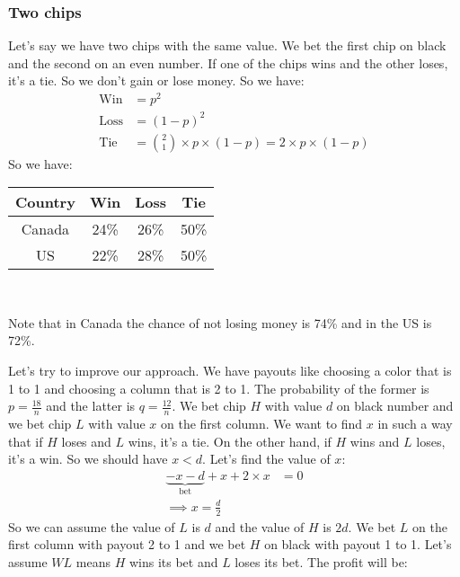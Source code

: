 \documentclass{book}
\begin{document}
	\subsubsection{Two chips}
	\label{subsubsection_two_chips}
	Let's say we have two chips with the same value. We bet the first chip on black and the second on an even number. If one of the chips wins and the other loses, it's a tie. So we don't gain or lose money. So we have:
	\begin{equation*}
		\begin{split}
			\text{Win} &= p^2 \\
			\text{Loss} &= (1 - p)^2 \\
			\text{Tie} &= \binom{2}{1} \times p \times (1 - p) = 2 \times p \times (1 - p)
		\end{split}
	\end{equation*}
	So we have: \\
	\par 
	\begin{tabular}[h!]{c c c c}
		\toprule
		Country & Win & Loss & Tie \\
		\midrule
		Canada & 24\% & 26\% & 50\% \\
		US & 22\% & 28\% & 50\% \\
		\bottomrule
	\end{tabular} \\
	\par Note that in Canada the chance of not losing money is 74\% and in the US is 72\%.
	\par Let's try to improve our approach. We have payouts like choosing a color that is 1 to 1 and choosing a column that is 2 to 1. The probability of the former is $p = \frac{18}{n}$ and the latter is $q = \frac{12}{n}$. We bet chip $H$ with value $d$ on black number and we bet chip $L$ with value $x$ on the first column. We want to find $x$ in such a way that if $H$ loses and $L$ wins, it's a tie. On the other hand, if $H$ wins and $L$ loses, it's a win. So we should have $x < d$. Let's find the value of $x$:
	\begin{equation*}
		\begin{split}
			\underbrace{-x -d}_\text{bet} + x + 2 \times x &= 0 \\
			\implies x = \frac{d}{2}			
		\end{split}
	\end{equation*}
	So we can assume the value of $L$ is $d$ and the value of $H$ is $2d$. We bet $L$ on the first column with payout 2 to 1 and we bet $H$ on black with payout 1 to 1. Let's assume $WL$ means $H$ wins its bet and $L$ loses its bet. The profit will be:
\end{document}
